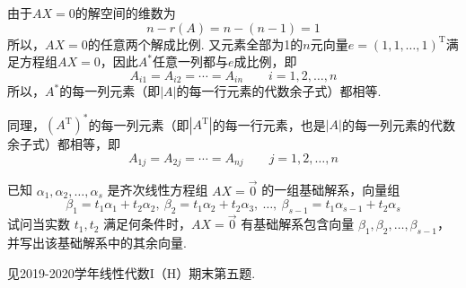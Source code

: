 \begin{exercise}
\begin{exgroup}
\begin{answer}
          由于$AX=0$的解空间的维数为
          \[ n-r(A)=n-(n-1)=1 \]
          所以，$AX=0$的任意两个解成比例. 又元素全部为1的$n$元向量$e=(1,1,\ldots,1)^\mathrm{T}$满足方程组$AX=0$，因此$A^*$任意一列都与$e$成比例，即
          \[ A_{i1}=A_{i2}=\cdots=A_{in} \qquad i=1,2,\ldots,n \]
          所以，$A^*$的每一列元素（即$|A|$的每一行元素的代数余子式）都相等.

          同理，$(A^\mathrm{T})^*$的每一列元素（即$|A^\mathrm{T}|$的每一行元素，也是$|A|$的每一列元素的代数余子式）都相等，即
          \[ A_{1j}=A_{2j}=\cdots=A_{nj} \qquad j=1,2,\ldots,n \]
        \end{answer}

        \item 已知 $\alpha_1,\alpha_2,\ldots,\alpha_s$ 是齐次线性方程组 $AX=\vec{0}$ 的一组基础解系，向量组
        \[\beta_1=t_1\alpha_1+t_2\alpha_2,\ \beta_2=t_1\alpha_2+t_2\alpha_3,\ \ldots,\ \beta_{s-1}=t_1\alpha_{s-1}+t_2\alpha_s\]
        试问当实数 $t_1,t_2$ 满足何条件时，$AX=\vec{0}$ 有基础解系包含向量 $\beta_1,\beta_2,\ldots,\beta_{s-1}$，并写出该基础解系中的其余向量.
        \begin{answer}
            见2019-2020学年线性代数I（H）期末第五题.
        \end{answer}


\end{exgroup}
\end{exercise}
